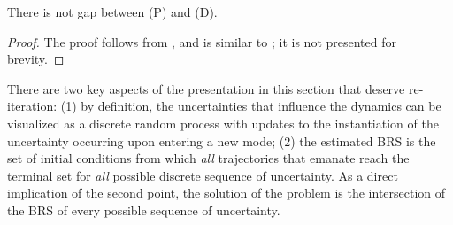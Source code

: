     \begin{lemma}
      There is not gap between (P) and (D).
    \end{lemma}
    \begin{proof}
      The proof follows from \cite[Theorem 3.10]{Anderson1987}, and is similar to \cite[Theorem 2]{henrion2014convex}; it is not presented for brevity.
    \end{proof}
    \begin{remark}
    There are two key aspects of the presentation in this section that deserve re-iteration: (1) by definition, the uncertainties that influence the dynamics can be visualized as a discrete random process with updates to the instantiation of the uncertainty occurring upon entering a new mode; (2) the estimated BRS is the set of initial conditions from which {\em all} trajectories that emanate reach the terminal set for {\em all} possible discrete sequence of uncertainty. As a direct implication of the second point, the solution of the problem is the intersection of the BRS of every possible sequence of uncertainty.
    \end{remark}
